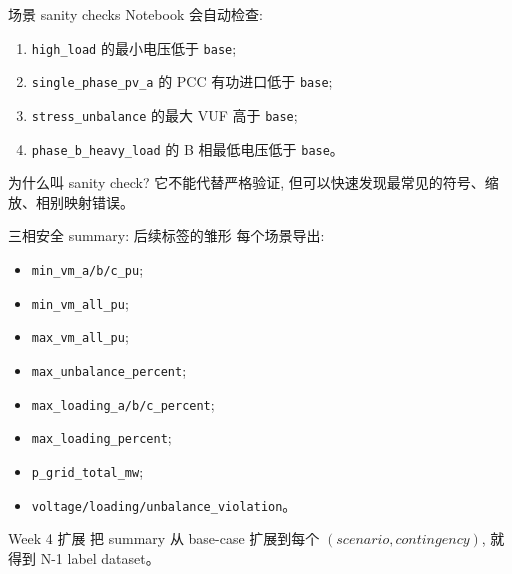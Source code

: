 \documentclass[aspectratio=169,10pt]{ctexbeamer}
\newcommand{\code}[1]{\texttt{#1}}
\begin{document}
\begin{frame}{场景 sanity checks}
Notebook 会自动检查:
\begin{enumerate}
  \item \code{high\_load} 的最小电压低于 \code{base};
  \item \code{single\_phase\_pv\_a} 的 PCC 有功进口低于 \code{base};
  \item \code{stress\_unbalance} 的最大 VUF 高于 \code{base};
  \item \code{phase\_b\_heavy\_load} 的 B 相最低电压低于 \code{base}。
\end{enumerate}
\vspace{0.6em}
\begin{block}{为什么叫 sanity check?}
它不能代替严格验证, 但可以快速发现最常见的符号、缩放、相别映射错误。
\end{block}
\end{frame}

\begin{frame}{三相安全 summary: 后续标签的雏形}
每个场景导出:
\begin{itemize}
  \item \code{min\_vm\_a/b/c\_pu};
  \item \code{min\_vm\_all\_pu};
  \item \code{max\_vm\_all\_pu};
  \item \code{max\_unbalance\_percent};
  \item \code{max\_loading\_a/b/c\_percent};
  \item \code{max\_loading\_percent};
  \item \code{p\_grid\_total\_mw};
  \item \code{voltage/loading/unbalance\_violation}。
\end{itemize}
\begin{alertblock}{Week 4 扩展}
把 summary 从 base-case 扩展到每个 $(scenario, contingency)$, 就得到 N-1 label dataset。
\end{alertblock}
\end{frame}
\end{document}
